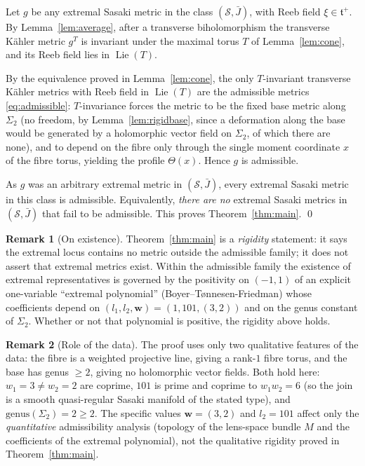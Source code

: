 \documentclass{amsart}
\theoremstyle{definition}
\newtheorem{remark}{Remark}
\DeclareMathOperator{\Lie}{Lie}
\begin{document}
Let $g$ be any extremal Sasaki metric in the class $(\mathcal S,\bar J)$, with
Reeb field $\xi\in\mathfrak t^+$. By Lemma~\ref{lem:average}, after a transverse
biholomorphism the transverse K\"ahler metric $g^T$ is invariant under the
maximal torus $T$ of Lemma~\ref{lem:cone}, and its Reeb field lies in $\Lie(T)$.

By the equivalence proved in Lemma~\ref{lem:cone}, the only $T$-invariant
transverse K\"ahler metrics with Reeb field in $\Lie(T)$ are the admissible
metrics \eqref{eq:admissible}: $T$-invariance forces the metric to be the fixed
base metric along $\Sigma_2$ (no freedom, by Lemma~\ref{lem:rigidbase}, since a
deformation along the base would be generated by a holomorphic vector field on
$\Sigma_2$, of which there are none), and to depend on the fibre only through the
single moment coordinate $x$ of the fibre torus, yielding the profile
$\Theta(x)$. Hence $g$ is admissible.

As $g$ was an arbitrary extremal metric in $(\mathcal S,\bar J)$, every extremal
Sasaki metric in this class is admissible. Equivalently, \emph{there are no}
extremal Sasaki metrics in $(\mathcal S,\bar J)$ that fail to be admissible.
This proves Theorem~\ref{thm:main}. \qed

\begin{remark}[On existence]
Theorem~\ref{thm:main} is a \emph{rigidity} statement: it says the extremal
locus contains no metric outside the admissible family; it does not assert that
extremal metrics exist. Within the admissible family the existence of extremal
representatives is governed by the positivity on $(-1,1)$ of an explicit
one-variable ``extremal polynomial'' (Boyer--Tønnesen-Friedman) whose
coefficients depend on $(l_1,l_2,\mathbf w)=(1,101,(3,2))$ and on the genus
constant of $\Sigma_2$. Whether or not that polynomial is positive, the
rigidity above holds.
\end{remark}

\begin{remark}[Role of the data]
The proof uses only two qualitative features of the data: the fibre is a
weighted projective line, giving a rank-$1$ fibre torus, and the base has genus
$\ge 2$, giving no holomorphic vector fields. Both hold here: $w_1=3\neq w_2=2$
are coprime, $101$ is prime and coprime to $w_1w_2=6$ (so the join is a smooth
quasi-regular Sasaki manifold of the stated type), and
$\mathrm{genus}(\Sigma_2)=2\ge 2$. The specific values $\mathbf w=(3,2)$ and
$l_2=101$ affect only the \emph{quantitative} admissibility analysis (topology
of the lens-space bundle $M$ and the coefficients of the extremal polynomial),
not the qualitative rigidity proved in Theorem~\ref{thm:main}.
\end{remark}
\end{document}
